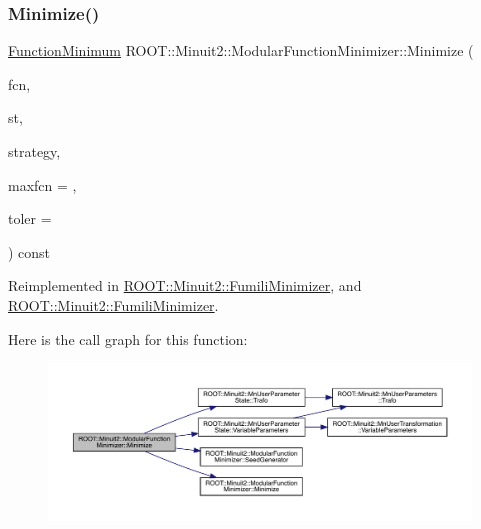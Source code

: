 \subsubsection{\texorpdfstring{Minimize()}{Minimize()}\hspace{0.1cm}{\footnotesize\ttfamily [17/22]}}
{\footnotesize\ttfamily \mbox{\hyperlink{classROOT_1_1Minuit2_1_1FunctionMinimum}{Function\+Minimum}} R\+O\+O\+T\+::\+Minuit2\+::\+Modular\+Function\+Minimizer\+::\+Minimize (\begin{DoxyParamCaption}\item[{const \mbox{\hyperlink{classROOT_1_1Minuit2_1_1FCNBase}{F\+C\+N\+Base}} \&}]{fcn,  }\item[{const \mbox{\hyperlink{classROOT_1_1Minuit2_1_1MnUserParameterState}{Mn\+User\+Parameter\+State}} \&}]{st,  }\item[{const \mbox{\hyperlink{classROOT_1_1Minuit2_1_1MnStrategy}{Mn\+Strategy}} \&}]{strategy,  }\item[{unsigned int}]{maxfcn = {},  }\item[{double}]{toler = {} }\end{DoxyParamCaption}) const\hspace{0.3cm}{\ttfamily [virtual]}}



Reimplemented in \mbox{\hyperlink{classROOT_1_1Minuit2_1_1FumiliMinimizer_a3da0ec7b2ba7f876809f72d2f3054eec}{R\+O\+O\+T\+::\+Minuit2\+::\+Fumili\+Minimizer}}, and \mbox{\hyperlink{classROOT_1_1Minuit2_1_1FumiliMinimizer_a3da0ec7b2ba7f876809f72d2f3054eec}{R\+O\+O\+T\+::\+Minuit2\+::\+Fumili\+Minimizer}}.

Here is the call graph for this function\+:\nopagebreak
\begin{figure}[H]
\begin{center}
\leavevmode
\includegraphics[width=350pt]{d3/dc8/classROOT_1_1Minuit2_1_1ModularFunctionMinimizer_a1ae6ed90bc87c3db98388f3d26980a51_cgraph}
\end{center}
\end{figure}
\mbox{\label{classROOT_1_1Minuit2_1_1ModularFunctionMinimizer_ad001dbb0a2d17022eb0818b4eddc2af9}} 
